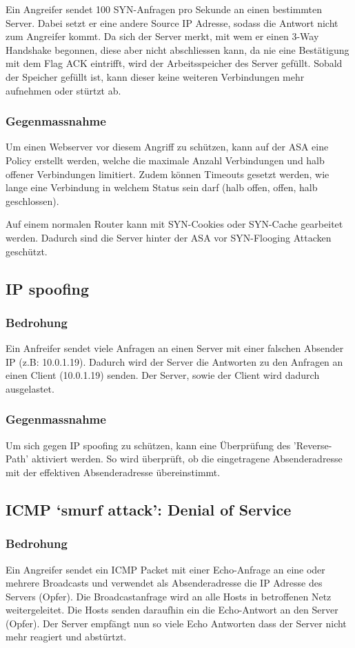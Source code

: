 \documentclass[11pt,a4paper,parskip=half]{scrartcl}
\begin{document}
Ein Angreifer sendet 100 SYN-Anfragen pro Sekunde an einen bestimmten Server. Dabei setzt er eine andere Source IP Adresse, sodass die Antwort nicht zum Angreifer kommt. Da sich der Server merkt, mit wem er einen 3-Way Handshake begonnen, diese aber nicht abschliessen kann, da nie eine Bestätigung mit dem Flag ACK eintrifft, wird der Arbeitsspeicher des Server gefüllt. Sobald der Speicher gefüllt ist, kann dieser keine weiteren Verbindungen mehr aufnehmen oder stürtzt ab.

\subsubsection{Gegenmassnahme}
Um einen Webserver vor diesem Angriff zu schützen, kann auf der ASA eine Policy erstellt werden, welche die maximale Anzahl Verbindungen und halb offener Verbindungen limitiert. Zudem können Timeouts gesetzt werden, wie lange eine Verbindung in welchem Status sein darf (halb offen, offen, halb geschlossen).

Auf einem normalen Router kann mit SYN-Cookies oder SYN-Cache gearbeitet werden. Dadurch sind die Server hinter der ASA vor SYN-Flooging Attacken geschützt.

\subsection{IP spoofing}
\subsubsection{Bedrohung}
Ein Anfreifer sendet viele Anfragen an einen Server mit einer falschen Absender IP (z.B: 10.0.1.19). Dadurch wird der Server die Antworten zu den Anfragen an einen Client (10.0.1.19) senden. Der Server, sowie der Client wird dadurch ausgelastet.
\subsubsection{Gegenmassnahme}
Um sich gegen IP spoofing zu schützen, kann eine Überprüfung des 'Reverse-Path' aktiviert werden. So wird überprüft, ob die eingetragene Absenderadresse mit der effektiven Absenderadresse übereinstimmt.

\subsection{ICMP ‘smurf attack’: Denial of Service}
\subsubsection{Bedrohung}
Ein Angreifer sendet ein ICMP Packet mit einer Echo-Anfrage an eine oder mehrere Broadcasts und verwendet als Absenderadresse die IP Adresse des Servers (Opfer). Die Broadcastanfrage wird an alle Hosts in betroffenen Netz weitergeleitet. Die Hosts senden daraufhin ein die Echo-Antwort an den Server (Opfer). Der Server empfängt nun so viele Echo Antworten dass der Server nicht mehr reagiert und abstürtzt.
\end{document}
